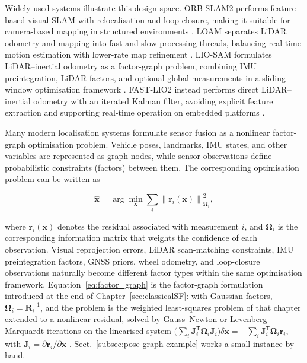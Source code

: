 Widely used systems illustrate this design space. ORB-SLAM2 performs feature-based visual SLAM with relocalisation and loop closure, making it suitable for camera-based mapping in structured environments \cite{murartal2017_orbslam2}. LOAM separates LiDAR odometry and mapping into fast and slow processing threads, balancing real-time motion estimation with lower-rate map refinement \cite{zhang2014_loam}. LIO-SAM formulates LiDAR--inertial odometry as a factor-graph problem, combining IMU preintegration, LiDAR factors, and optional global measurements in a sliding-window optimisation framework \cite{shan2020_liosam}. FAST-LIO2 instead performs direct LiDAR--inertial odometry with an iterated Kalman filter, avoiding explicit feature extraction and supporting real-time operation on embedded platforms \cite{xu2022_fastlio2}.

Many modern localisation systems formulate sensor fusion as a nonlinear factor-graph optimisation problem. Vehicle poses, landmarks, IMU states, and other variables are represented as graph nodes, while sensor observations define probabilistic constraints (factors) between them. The corresponding optimisation problem can be written as

\begin{equation}
\hat{\mathbf{x}}
=
\arg\min_{\mathbf{x}}
\sum_i
\left\|
\mathbf{r}_i(\mathbf{x})
\right\|_{\mathbf{\Omega}_i}^{2},
\label{eq:factor_graph}
\end{equation}

where $\mathbf{r}_i(\mathbf{x})$ denotes the residual associated with measurement $i$, and $\mathbf{\Omega}_i$ is the corresponding information matrix that weights the confidence of each observation. Visual reprojection errors, LiDAR scan-matching constraints, IMU preintegration factors, GNSS priors, wheel odometry, and loop-closure observations naturally become different factor types within the same optimisation framework. Equation~\eqref{eq:factor_graph} is the factor-graph formulation introduced at the end of Chapter~\ref{sec:classicalSF}: with Gaussian factors, $\mathbf{\Omega}_i=\mathbf{R}_i^{-1}$, and the problem is the weighted least-squares problem of that chapter extended to a nonlinear residual, solved by Gauss--Newton or Levenberg--Marquardt iterations on the linearised system $\big(\sum_i\mathbf{J}_i^{\mathsf T}\mathbf{\Omega}_i\mathbf{J}_i\big)\delta\mathbf{x}=-\sum_i\mathbf{J}_i^{\mathsf T}\mathbf{\Omega}_i\mathbf{r}_i$, with $\mathbf{J}_i=\partial\mathbf{r}_i/\partial\mathbf{x}$ \cite{grisetti2010_graphslam,dellaert2017_factor_graphs}. Sect.~\ref{subsec:pose-graph-example} works a small instance by hand.

